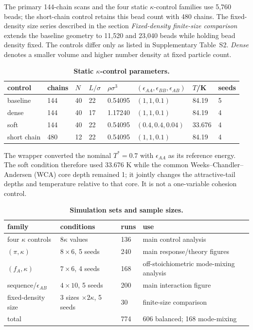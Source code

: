 \documentclass[pdflatex,sn-nature,onecolumn]{sn-jnl}
\begin{document}
The primary 144-chain scans and the four static $\kappa$-control families use 5,760 beads; the short-chain control retains this bead count with 480 chains. The fixed-density size series described in the section \emph{Fixed-density finite-size comparison} extends the baseline geometry to 11,520 and 23,040 beads while holding bead density fixed. The controls differ only as listed in Supplementary Table~S2. \emph{Dense} denotes a smaller volume and higher number density at fixed particle count.

\begin{table}[!htbp]
\centering
\caption{\textbf{Static $\kappa$-control parameters.}}
\label{tab:kappa-control-parameters}
\begin{tabular}{llllllll}
\toprule
control & chains & $N$ & $L/\sigma$ & $\rho\sigma^3$ & $(\epsilon_{AA},\epsilon_{BB},\epsilon_{AB})$ & $T$/K & seeds\\
\midrule
baseline & 144 & 40 & 22 & 0.54095 & $(1,1,0.1)$ & 84.19 & 5\\
dense & 144 & 40 & 17 & 1.17240 & $(1,1,0.1)$ & 84.19 & 4\\
soft & 144 & 40 & 22 & 0.54095 & $(0.4,0.4,0.04)$ & 33.676 & 4\\
short chain & 480 & 12 & 22 & 0.54095 & $(1,1,0.1)$ & 84.19 & 4\\
\bottomrule
\end{tabular}
\end{table}

The wrapper converted the nominal $T^*=0.7$ with $\epsilon_{AA}$ as its reference energy. The soft condition therefore used 33.676 K while the common Weeks--Chandler--Andersen (WCA) core depth remained 1; it jointly changes the attractive-tail depths and temperature relative to that core. It is not a one-variable cohesion control.

\begin{table}[!htbp]
\centering
\caption{\textbf{Simulation sets and sample sizes.}}
\label{tab:simulation-sets}
\begin{tabularx}{\linewidth}{@{}lllX@{}}
\toprule
family & conditions & runs & use\\
\midrule
four $\kappa$ controls & $8\kappa$ values & 136 & main control analysis\\
$(\pi,\kappa)$ & $8\times6$, 5 seeds & 240 & main response/theory figures\\
$(f_A,\kappa)$ & $7\times6$, 4 seeds & 168 & off-stoichiometric mode-mixing analysis\\
sequence/$\epsilon_{AB}$ & $4\times10$, 5 seeds & 200 & main interaction figure\\
fixed-density size & 3 sizes $\times2\kappa$, 5 seeds & 30 & finite-size comparison\\
\midrule
total & & 774 & 606 balanced; 168 mode-mixing\\
\bottomrule
\end{tabularx}
\end{table}
\end{document}
